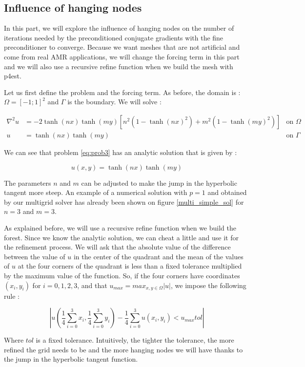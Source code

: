 \subsection{Influence of hanging nodes}
 In this part, we will explore the influence of hanging nodes on the number of iterations needed by the preconditioned conjugate gradients with the fine preconditioner to converge. Because we want meshes that are not artificial and come from real AMR applications, we will change the forcing term in this part and we will also use a recursive refine function when we build the mesh with p4est. 
 
 Let us first define the problem and the forcing term. As before, the domain is : $\Omega = [-1;1]^2$ and $\Gamma$ is the boundary. We will solve : 
 
 \begin{align}
 \nabla^2 u &= -2\tanh(nx)\tanh(my)\left[ n^2(1-\tanh(nx)^2) + m^2(1-\tanh(my)^2)\right] &\text{on $\Omega$} \label{eq:prob3}\\
u &= \tanh(nx)\tanh(my)  &\text{on $\Gamma$}
 \end{align}
 
 We can see that problem \ref{eq:prob3} has an analytic solution that is given by :
 
 $$u(x,y) = \tanh(nx)\tanh(my)$$
 
 The parameters $n$ and $m$ can be adjusted to make the jump in the hyperbolic tangent more steep. An example of a numerical solution with $p=1$ and obtained by our multigrid solver has already been shown on figure \ref{multi_simple_sol} for $n=3$ and $m=3$. 
 
 As explained before, we will use a recursive refine function when we build the forest. Since we know the analytic solution, we can cheat a little and use it for the refinement process. We will ask that the absolute value of the difference between the value of $u$ in the center of the quadrant and the mean of the values of $u$ at the four corners of the quadrant is less than a fixed tolerance multiplied by the maximum value of the function. So, if the four corners have coordinates $(x_i , y_i)$ for $i=0,1,2,3$, and that $u_{max} = max_{x,y \in \Omega} \left| u \right|$, we impose the following rule :
 
  $$\left| u(\frac{1}{4}\sum_{i=0}^3 x_i , \frac{1}{4}\sum_{i=0}^3 y_i) - \frac{1}{4}\sum_{i=0}^3 u(x_i,y_i) < u_{max} tol\right|$$ 
  
Where $tol$ is a fixed tolerance. Intuitively, the tighter the tolerance, the more refined the grid needs to be and the more hanging nodes we will have thanks to the jump in the hyperbolic tangent function. 

